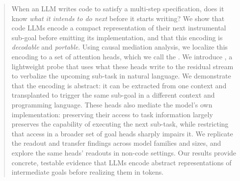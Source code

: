 \begin{abstract}
When an LLM writes code to satisfy a multi-step specification, does it know \emph{what it intends to do next} before it starts writing? We show that code LLMs encode a compact representation of their next instrumental sub-goal before emitting its implementation, and that this encoding is \emph{decodable} and \emph{portable}. Using causal mediation analysis, we localize this encoding to a set of attention heads, which we call the \goalheads. We introduce \goalscope, a lightweight probe that uses what these heads write to the residual stream to verbalize the upcoming sub-task in natural language. We demonstrate that the encoding is abstract: it can be extracted from one context and transplanted to trigger the same sub-goal in a different context and programming language. These heads also mediate the model's own implementation: preserving their access to task information largely preserves the capability of executing the next sub-task, while restricting that access in a broader set of goal heads sharply impairs it. We replicate the readout and transfer findings across model families and sizes, and explore the same heads' readouts in non-code settings. Our results provide concrete, testable evidence that LLMs encode abstract representations of intermediate goals before realizing them in tokens.
\end{abstract}
